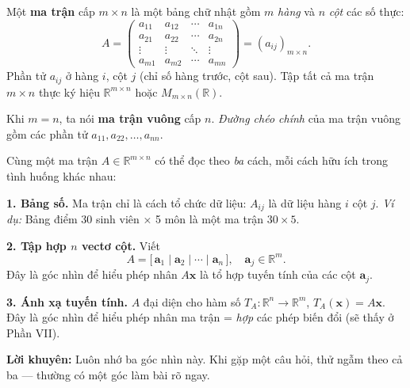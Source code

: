 \documentclass[12pt,a4paper]{article}
\begin{document}
\begin{dinhnghia}
  Một \textbf{ma trận} cấp $m \times n$ là một bảng chữ nhật gồm $m$ \emph{hàng} và $n$ \emph{cột} các số thực:
  \[
    A = \begin{pmatrix}
      a_{11} & a_{12} & \cdots & a_{1n} \\
      a_{21} & a_{22} & \cdots & a_{2n} \\
      \vdots & \vdots & \ddots & \vdots \\
      a_{m1} & a_{m2} & \cdots & a_{mn}
    \end{pmatrix}
    = (a_{ij})_{m \times n}.
  \]
  Phần tử $a_{ij}$ ở hàng $i$, cột $j$ (chỉ số hàng trước, cột sau). Tập tất cả ma trận $m \times n$ thực ký hiệu $\mathbb{R}^{m\times n}$ hoặc $M_{m\times n}(\mathbb{R})$.

  Khi $m = n$, ta nói \textbf{ma trận vuông} cấp $n$. \emph{Đường chéo chính} của ma trận vuông gồm các phần tử $a_{11}, a_{22}, \ldots, a_{nn}$.
\end{dinhnghia}

\begin{ynghia}[title={Ba góc nhìn về ma trận -- thay đổi đời bạn!}]
Cùng một ma trận $A \in \mathbb{R}^{m\times n}$ có thể đọc theo \emph{ba} cách, mỗi cách hữu ích trong tình huống khác nhau:

\medskip
\textbf{1. Bảng số.} Ma trận chỉ là cách tổ chức dữ liệu: $A_{ij}$ là dữ liệu hàng $i$ cột $j$.
\emph{Ví dụ:} Bảng điểm 30 sinh viên × 5 môn là một ma trận $30 \times 5$.

\medskip
\textbf{2. Tập hợp $n$ vectơ cột.} Viết
\[
  A = \bigl[\, \mathbf{a}_1 \mid \mathbf{a}_2 \mid \cdots \mid \mathbf{a}_n \,\bigr], \quad \mathbf{a}_j \in \mathbb{R}^m.
\]
Đây là góc nhìn để hiểu phép nhân $A\mathbf{x}$ là tổ hợp tuyến tính của các cột $\mathbf{a}_j$.

\medskip
\textbf{3. Ánh xạ tuyến tính.} $A$ đại diện cho hàm số $T_A: \mathbb{R}^n \to \mathbb{R}^m$, $T_A(\mathbf{x}) = A\mathbf{x}$. Đây là góc nhìn để hiểu phép nhân ma trận = \emph{hợp} các phép biến đổi (sẽ thấy ở Phần VII).

\medskip
\textbf{Lời khuyên:} Luôn nhớ ba góc nhìn này. Khi gặp một câu hỏi, thử ngẫm theo cả ba — thường có một góc làm bài rõ ngay.
\end{ynghia}
\end{document}
